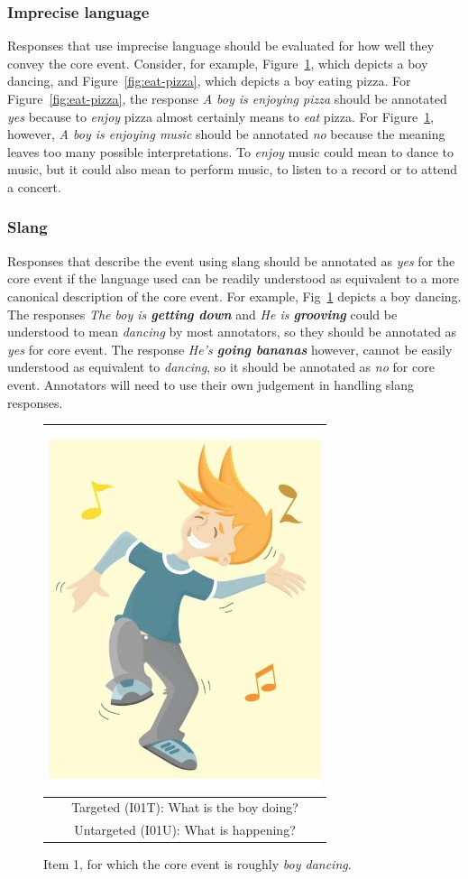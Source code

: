\documentclass[12pt]{article}
\begin{document}
\subsubsection{Imprecise language} Responses that use imprecise language should be evaluated for how well they convey the core event. Consider, for example, Figure~\ref{fig:dance}, which depicts a boy dancing, and Figure~\ref{fig:eat-pizza}, which depicts a boy eating pizza. For Figure~\ref{fig:eat-pizza}, the response \textit{A boy is enjoying pizza} should be annotated \textit{yes} because to \textit{enjoy} pizza almost certainly means to \textit{eat} pizza. For Figure~\ref{fig:dance}, however, \textit{A boy is enjoying music} should be annotated \textit{no} because the meaning leaves too many possible interpretations. To \textit{enjoy} music could mean to dance to music, but it could also mean to perform music, to listen to a record or to attend a concert.

\subsubsection{Slang} Responses that describe the event using slang should be annotated as \textit{yes} for the core event if the language used can be readily understood as equivalent to a more canonical description of the core event. For example, Fig~\ref{fig:dance} depicts a boy dancing. The responses \textit{The boy is \textbf{getting down}} and \textit{He is \textbf{grooving}} could be understood to mean \textit{dancing} by most annotators, so they should be annotated as \textit{yes} for core event. The response \textit{He's \textbf{going bananas}} however, cannot be easily understood as equivalent to \textit{dancing}, so it should be annotated as \textit{no} for core event. Annotators will need to use their own judgement in handling slang responses.

\begin{figure}[h]
\begin{center}
\begin{tabular}{|c|}
\hline
\includegraphics[width=0.4\columnwidth,trim=0 0 0 -3]{figures/I01.jpg}\\
\hline
Targeted (I01T): What is the boy doing?\\
\hline
Untargeted (I01U): What is happening? \\
\hline
\end{tabular}
\end{center}
\caption{Item 1, for which the core event is roughly \textit{boy dancing}.}
\label{fig:dance}
\end{figure}
\end{document}
